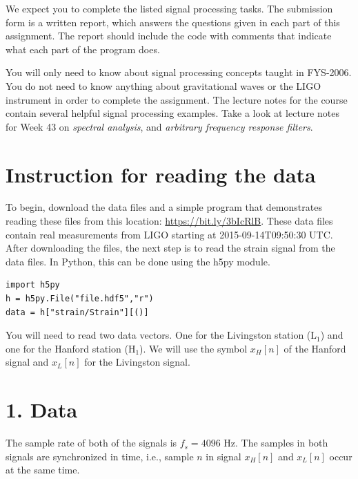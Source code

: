 We expect you to complete the listed signal processing tasks. The
submission form is a written report, which answers the questions given
in each part of this assignment. The report should include the code
with comments that indicate what each part of the program does.


You will only need to know about signal processing concepts taught in
FYS-2006. You do not need to know anything about gravitational waves
or the LIGO instrument in order to complete the assignment. The
lecture notes for the course contain several helpful signal processing
examples. Take a look at lecture notes for Week 43 on \emph{spectral
  analysis}, and \emph{arbitrary frequency response filters}.


\section{Instruction for reading the data}

To begin, download the data files and a simple program that
demonstrates reading these files from this location:
\url{https://bit.ly/3bIcRlB}. These data files contain real
measurements from LIGO starting at 2015-09-14T09:50:30 UTC. After
downloading the files, the next step is to read the strain signal from
the data files. In Python, this can be done using the 
h5py module.
\begin{verbatim}
import h5py
h = h5py.File("file.hdf5","r")
data = h["strain/Strain"][()]
\end{verbatim}
You will need to read two data vectors. One for the Livingston station
(L$_1$) and one for the Hanford station (H$_1$). We will use the symbol $x_H[n]$
of the Hanford signal and $x_L[n]$ for the Livingston signal.

\section{1. Data}
The sample rate of both of the signals is $f_s=4096$ Hz. The samples
in both signals are synchronized in time, i.e., sample $n$ in signal
$x_H[n]$ and $x_L[n]$ occur at the same time.


